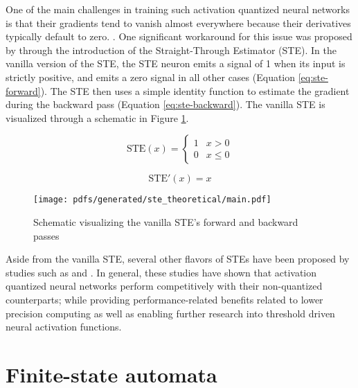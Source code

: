 One of the main challenges in training such activation quantized neural networks
is that their gradients tend to vanish almost everywhere because their
derivatives typically default to zero.
\citep{bengio2013estimating,courbariaux2016binarized,yin2019understanding}. One
significant workaround for this issue was proposed by
\citet{bengio2013estimating} through the introduction of the Straight-Through
Estimator (STE). In the vanilla version of the STE, the STE neuron emits a
signal of 1 when its input is strictly positive, and emits a zero signal in all
other cases (Equation \ref{eq:ste-forward}). The STE then uses a simple identity
function to estimate the gradient during the backward pass (Equation
\ref{eq:ste-backward}). The vanilla STE is visualized through a schematic in
Figure \ref{fig:straight-through-estimator}.

\begin{equation}
  \label{eq:ste-forward}
  \text{STE}(x)=
  \begin{cases}
    1 & x > 0 \\
    0 & x \leq 0
  \end{cases}
\end{equation}

\begin{equation}
  \label{eq:ste-backward}
  \text{STE}'(x)= x
\end{equation}

\begin{figure}[t]
  \centering
  \texttt{[image: pdfs/generated/ste\_theoretical/main.pdf]}
  \caption{Schematic visualizing the vanilla STE's forward and backward passes}
  \label{fig:straight-through-estimator}
\end{figure}

Aside from the vanilla STE, several other flavors of STEs have been proposed by
studies such as \citet{courbariaux2016binarized} and
\citet{yin2019understanding}. In general, these studies have shown that
activation quantized neural networks perform competitively with their
non-quantized counterparts; while providing performance-related benefits related
to lower precision computing as well as enabling further research into threshold
driven neural activation functions.

\section{Finite-state automata}

\label{section:fsa}

